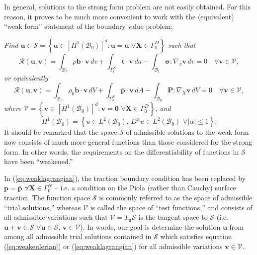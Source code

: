 In general, solutions to the strong form problem are not easily obtained. For this reason, it proves to be much more convenient to work with the (equivalent) ``weak form'' statement of the boundary value problem:

\textit{Find $\mathbf{u} \in \mathcal{S} = \left\{ \mathbf{u} \in \left[H^{1} (\mathcal{B}_0)\right]^d \colon \mathbf{u} = \bar{\mathbf{u}} \, \, \forall \mathbf{X} \in \Gamma^D_0 \right\}$ such that}
\begin{equation}
  \mathcal{R}(\mathbf{u}, \mathbf{v}) = \int_{\mathcal{B}_t} \rho \mathbf{b} \cdot \mathbf{v} \, dv + \int_{\Gamma^N_t} \bar{\mathbf{t}} \cdot \mathbf{v} \, da - \int_{\mathcal{B}_t} \boldsymbol{\sigma} \colon \nabla_x \mathbf{v} \, dv = 0 \quad \forall \mathbf{v} \in \mathcal{V},
  \label{eq:weakeulerian}
\end{equation}
\textit{or equivalently}
\begin{equation}
  \mathcal{R}(\mathbf{u}, \mathbf{v}) = \int_{\mathcal{B}_0} \rho_0 \mathbf{b} \cdot \mathbf{v} \, dV + \int_{\Gamma^N_0} \bar{\mathbf{p}} \cdot \mathbf{v} \, dA - \int_{\mathcal{B}_0} \mathbf{P} \colon \nabla_X \mathbf{v} \, dV = 0 \quad \forall \mathbf{v} \in \mathcal{V},
  \label{eq:weaklagrangian}
\end{equation}
\textit{where $\mathcal{V} = \left\{ \mathbf{v} \in \left[H^{1} (\mathcal{B}_0)\right]^d \colon \mathbf{v} = \mathbf{0} \, \, \forall \mathbf{X} \in \Gamma^D_0 \right\}$, and}
\begin{equation}
  H^{1} (\mathcal{B}_0) = \left\{ u \in L^2 (\mathcal{B}_0), \, D^{\alpha} u \in L^2 (\mathcal{B}_0) \, \, \forall | \alpha | \leq 1 \right\}.
\end{equation}
It should be remarked that the space $\mathcal{S}$ of admissible solutions to the weak form now consists of much more general functions than those considered for the strong form. In other words, the requirements on the differentiability of functions in $\mathcal{S}$ have been ``weakened.''

In (\ref{eq:weaklagrangian}), the traction boundary condition has been replaced by $\mathbf{p} = \bar{\mathbf{p}} \, \, \forall \mathbf{X} \in \Gamma^N_0$ -- i.e. a condition on the Piola (rather than Cauchy) surface traction. The function space $\mathcal{S}$ is commonly referred to as the space of admissible ``trial solutions,'' whereas $\mathcal{V}$ is called the space of ``test functions,'' and consists of all admissible variations such that $\mathcal{V} = T_{\mathbf{u}} \mathcal{S}$ is the tangent space to $\mathcal{S}$ (i.e. $\mathbf{u} + \mathbf{v} \in \mathcal{S} \, \, \forall \mathbf{u} \in \mathcal{S}, \, \mathbf{v} \in \mathcal{V}$). In words, our goal is determine the solution $\mathbf{u}$ from among all admissible trial solutions contained in $\mathcal{S}$ which satisfies equation (\ref{eq:weakeulerian}) or (\ref{eq:weaklagrangian}) for all admissible variations $\mathbf{v} \in \mathcal{V}$.

